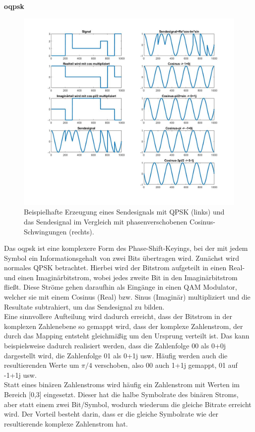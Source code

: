 \textbf{\ac{oqpsk}}\\
\begin{figure}
	\centering
	\includegraphics[width=\textwidth]{Grafiken-Alex/qpsk.jpg}
	\caption{Beispielhafte Erzeugung eines Sendesignals mit QPSK (links) und das Sendesignal im Vergleich mit phasenverschobenen Cosinus-Schwingungen (rechts).}
	\label{qpsk}
\end{figure}
Das \acf{oqpsk} ist eine komplexere Form des Phase-Shift-Keyings, bei der mit jedem Symbol ein Informationsgehalt von zwei Bits übertragen wird. Zunächst wird normales QPSK betrachtet. Hierbei wird der Bitstrom aufgeteilt in einen Real- und einen Imaginärbitstrom, wobei jedes zweite Bit in den Imaginärbitstrom fließt. Diese Ströme gehen daraufhin als Eingänge in einen \ac{QAM} Modulator, welcher sie mit einem Cosinus (Real) bzw. Sinus (Imaginär) multipliziert und die Resultate subtrahiert, um das Sendesignal zu bilden.\\
Eine sinnvollere Aufteilung wird dadurch erreicht, dass der Bitstrom in der komplexen Zahlenebene so gemappt wird, dass der komplexe Zahlenstrom, der durch das Mapping entsteht gleichmäßig um den Ursprung verteilt ist. Das kann beispielsweise dadurch realisiert werden, dass die Zahlenfolge 00 als 0+0j dargestellt wird, die Zahlenfolge 01 als 0+1j usw. Häufig werden auch die resultierenden Werte um $\pi/4$ verschoben, also 00 auch 1+1j gemappt, 01 auf -1+1j usw.\\
Statt eines binären Zahlenstroms wird häufig ein Zahlenstrom mit Werten im Bereich [0,3] eingesetzt. Dieser hat die halbe Symbolrate des binären Stroms, aber statt einem zwei Bit/Symbol, wodurch wiederum die gleiche Bitrate erreicht wird. Der Vorteil besteht darin, dass er die gleiche Symbolrate wie der resultierende komplexe Zahlenstrom hat.\\
